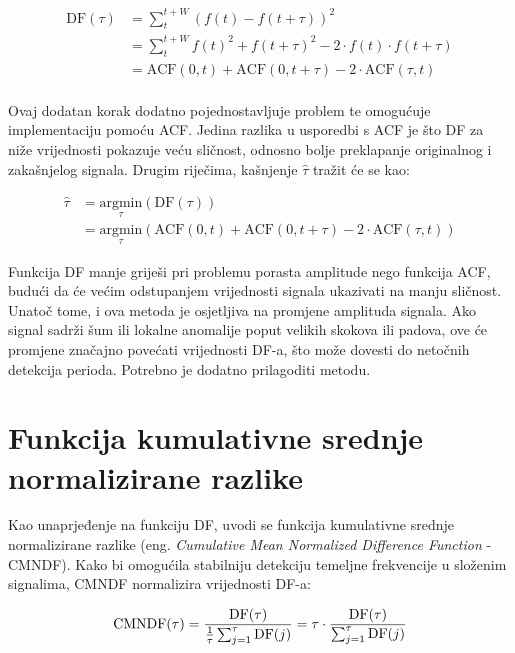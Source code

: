 \documentclass[times, utf8, diplomski, numeric]{fer}
\begin{document}
\begin{equation}
	\begin{split}
		\mathrm{DF}(\tau) &= \sum_{t}^{t + W} {(f(t) - f(t + \tau))^2} \\
		&= \sum_{t}^{t + W} {f(t)^2 + f(t + \tau)^2 - 2 \cdot f(t) \cdot f(t + \tau)} \\
		&= \mathrm{ACF}(0, t) + \mathrm{ACF}(0, t + \tau) - 2 \cdot \mathrm{ACF}(\tau, t) \\
	\end{split}
\end{equation}

Ovaj dodatan korak dodatno pojednostavljuje problem te omogućuje implementaciju pomoću ACF. Jedina razlika u usporedbi s ACF je što DF za niže vrijednosti pokazuje veću sličnost, odnosno bolje preklapanje originalnog i zakašnjelog signala. Drugim riječima, kašnjenje $\hat{\tau}$ tražit će se kao:

\begin{equation}
	\begin{split}
		\hat{\tau} &= \underset{\tau}{\mathrm{argmin}} (\mathrm{DF}(\tau)) \\
		&= \underset{\tau}{\mathrm{argmin}} (\mathrm{ACF}(0, t) + \mathrm{ACF}(0, t + \tau) - 2 \cdot \mathrm{ACF}(\tau, t))
	\end{split}
\end{equation}

Funkcija DF manje griješi pri problemu porasta amplitude nego funkcija ACF, budući da će većim odstupanjem vrijednosti signala ukazivati na manju sličnost. Unatoč tome, i ova metoda je osjetljiva na promjene amplituda signala. Ako signal sadrži šum ili lokalne anomalije poput velikih skokova ili padova, ove će promjene značajno povećati vrijednosti DF-a, što može dovesti do netočnih detekcija perioda. Potrebno je dodatno prilagoditi metodu.

\section{Funkcija kumulativne srednje normalizirane razlike}
%
Kao unaprjeđenje na funkciju DF, uvodi se funkcija kumulativne srednje normalizirane razlike (eng. \textit{Cumulative Mean Normalized Difference Function} - CMNDF). Kako bi omogućila stabilniju detekciju temeljne frekvencije u složenim signalima, CMNDF normalizira vrijednosti DF-a:

\begin{equation}
	\mathrm{CMNDF}(\tau) = \frac{\mathrm{DF}(\tau)}{\frac{1}{\tau}\sum_{j = 1}^{\tau}{\mathrm{DF}(j)}} = \tau \cdot \frac{\mathrm{DF}(\tau)}{\sum_{j = 1}^{\tau}{\mathrm{DF}(j)}} \\
\end{equation}
\end{document}
